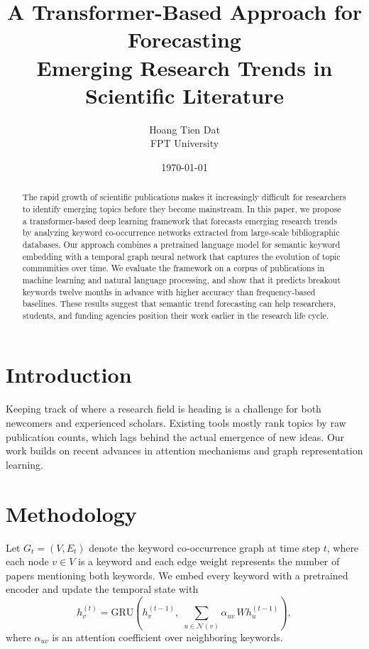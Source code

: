\documentclass[11pt]{article}
\title{A Transformer-Based Approach for Forecasting\\Emerging Research Trends in Scientific Literature}
\author{Hoang Tien Dat \\ FPT University}
\date{\today}
\begin{document}
\maketitle

\begin{abstract}
The rapid growth of scientific publications makes it increasingly difficult
for researchers to identify emerging topics before they become mainstream.
In this paper, we propose a transformer-based deep learning framework that
forecasts emerging research trends by analyzing keyword co-occurrence
networks extracted from large-scale bibliographic databases. Our approach
combines a pretrained language model for semantic keyword embedding with a
temporal graph neural network that captures the evolution of topic
communities over time. We evaluate the framework on a corpus of publications
in machine learning and natural language processing, and show that it
predicts breakout keywords twelve months in advance with higher accuracy
than frequency-based baselines. These results suggest that semantic trend
forecasting can help researchers, students, and funding agencies position
their work earlier in the research life cycle.
\end{abstract}

\section{Introduction}
Keeping track of where a research field is heading is a challenge for both
newcomers and experienced scholars. Existing tools mostly rank topics by
raw publication counts, which lags behind the actual emergence of new ideas.
Our work builds on recent advances in attention mechanisms and graph
representation learning.

\section{Methodology}
Let $G_t = (V, E_t)$ denote the keyword co-occurrence graph at time step
$t$, where each node $v \in V$ is a keyword and each edge weight represents
the number of papers mentioning both keywords. We embed every keyword with
a pretrained encoder and update the temporal state with
\begin{equation}
  h_v^{(t)} = \mathrm{GRU}\!\left(h_v^{(t-1)},\;
  \sum_{u \in \mathcal{N}(v)} \alpha_{uv}\, W h_u^{(t-1)}\right),
\end{equation}
where $\alpha_{uv}$ is an attention coefficient over neighboring keywords.
\end{document}
